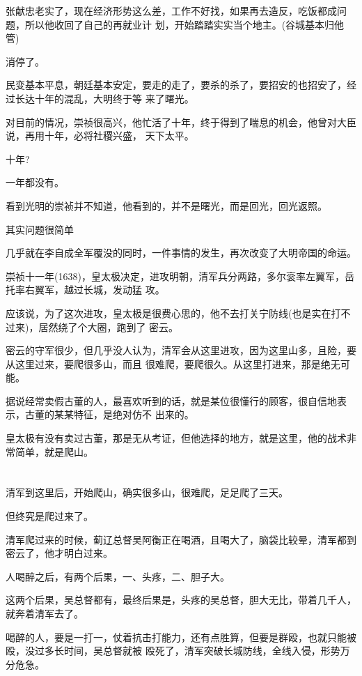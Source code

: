 \documentclass[11pt,a4paper,onecolumn]{article}
\begin{document}
张献忠老实了，现在经济形势这么差，工作不好找，如果再去造反，吃饭都成问题，所以他收回了自己的再就业计
划，开始踏踏实实当个地主。(谷城基本归他管)

消停了。

民变基本平息，朝廷基本安定，要走的走了，要杀的杀了，要招安的也招安了，经过长达十年的混乱，大明终于等
来了曙光。

对目前的情况，崇祯很高兴，他忙活了十年，终于得到了喘息的机会，他曾对大臣说，再用十年，必将社稷兴盛，
天下太平。

十年?

一年都没有。

看到光明的崇祯并不知道，他看到的，并不是曙光，而是回光，回光返照。

其实问题很简单

几乎就在李自成全军覆没的同时，一件事情的发生，再次改变了大明帝国的命运。

崇祯十一年(1638)，皇太极决定，进攻明朝，清军兵分两路，多尔衮率左翼军，岳托率右翼军，越过长城，发动猛
攻。

应该说，为了这次进攻，皇太极是很费心思的，他不去打关宁防线(也是实在打不过来)，居然绕了个大圈，跑到了
密云。

密云的守军很少，但几乎没人认为，清军会从这里进攻，因为这里山多，且险，要从这里过来，要爬很多山，而且
很难爬，要爬很久。从这里打进来，那是绝无可能。

据说经常卖假古董的人，最喜欢听到的话，就是某位很懂行的顾客，很自信地表示，古董的某某特征，是绝对仿不
出来的。

皇太极有没有卖过古董，那是无从考证，但他选择的地方，就是这里，他的战术非常简单，就是爬山。

\section[\thesection]{}

清军到这里后，开始爬山，确实很多山，很难爬，足足爬了三天。

但终究是爬过来了。

清军爬过来的时候，蓟辽总督吴阿衡正在喝酒，且喝大了，脑袋比较晕，清军都到密云了，他才明白过来。

人喝醉之后，有两个后果，一、头疼，二、胆子大。

这两个后果，吴总督都有，最终后果是，头疼的吴总督，胆大无比，带着几千人，就奔着清军去了。

喝醉的人，要是一打一，仗着抗击打能力，还有点胜算，但要是群殴，也就只能被殴，没过多长时间，吴总督就被
殴死了，清军突破长城防线，全线入侵，形势万分危急。
\end{document}
